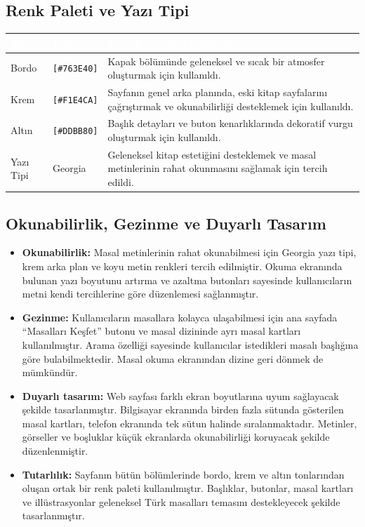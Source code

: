 \documentclass[12pt,a4paper]{article}
\begin{document}
\subsection{Renk Paleti ve Yazı Tipi}
\begin{center}
\begin{tabular}{@{}llp{6.4cm}@{}}
\toprule
\rowcolor{ana}\textcolor{white}{\textbf{Ad}} & \textcolor{white}{\textbf{Kod}} & \textcolor{white}{\textbf{Nerede / neden kullandınız?}} \\
\midrule
\relax Bordo & \texttt{[\#763E40]} & Kapak bölümünde geleneksel ve sıcak bir atmosfer oluşturmak için kullanıldı. \\
\relax Krem & \texttt{[\#F1E4CA]} & Sayfanın genel arka planında, eski kitap sayfalarını çağrıştırmak ve okunabilirliği desteklemek için kullanıldı. \\
\relax Altın & \texttt{[\#DDBB80]} & Başlık detayları ve buton kenarlıklarında dekoratif vurgu oluşturmak için kullanıldı. \\
\relax Yazı Tipi & Georgia & Geleneksel kitap estetiğini desteklemek ve masal metinlerinin rahat okunmasını sağlamak için tercih edildi. \\
\bottomrule
\end{tabular}
\end{center}

\subsection{Okunabilirlik, Gezinme ve Duyarlı Tasarım}
\begin{itemize}
  \item \textbf{Okunabilirlik:}  Masal metinlerinin rahat okunabilmesi için Georgia yazı tipi, krem arka plan ve koyu metin renkleri tercih edilmiştir. Okuma ekranında bulunan yazı boyutunu artırma ve azaltma butonları sayesinde kullanıcıların metni kendi tercihlerine göre düzenlemesi sağlanmıştır.

  \item \textbf{Gezinme:} Kullanıcıların masallara kolayca ulaşabilmesi için ana sayfada ``Masalları Keşfet'' butonu ve masal dizininde ayrı masal kartları kullanılmıştır. Arama özelliği sayesinde kullanıcılar istedikleri masalı başlığına göre bulabilmektedir. Masal okuma ekranından dizine geri dönmek de mümkündür.
  \item \textbf{Duyarlı tasarım:} Web sayfası farklı ekran boyutlarına uyum sağlayacak şekilde tasarlanmıştır. Bilgisayar ekranında birden fazla sütunda gösterilen masal kartları, telefon ekranında tek sütun halinde sıralanmaktadır. Metinler, görseller ve boşluklar küçük ekranlarda okunabilirliği koruyacak şekilde düzenlenmiştir.

  \item \textbf{Tutarlılık:} Sayfanın bütün bölümlerinde bordo, krem ve altın tonlarından oluşan ortak bir renk paleti kullanılmıştır. Başlıklar, butonlar, masal kartları ve illüstrasyonlar geleneksel Türk masalları temasını destekleyecek şekilde tasarlanmıştır.
\end{itemize}
\end{document}
